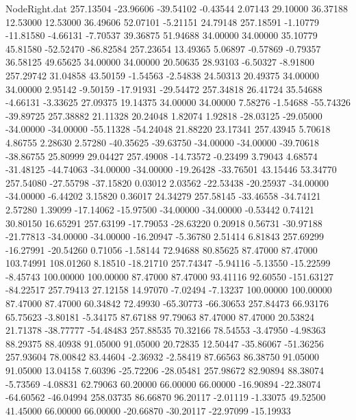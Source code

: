 \begin{filecontents}{NodeRight.dat}
 257.13504  -23.96606  -39.54102    -0.43544    2.07143   29.10000   36.37188   12.53000   12.53000   36.49606   52.07101   -5.21151   24.79148
 257.18591   -1.10779  -11.81580    -4.66131   -7.70537   39.36875   51.94688   34.00000   34.00000   35.10779   45.81580  -52.52470  -86.82584
 257.23654   13.49365    5.06897    -0.57869   -0.79357   36.58125   49.65625   34.00000   34.00000   20.50635   28.93103   -6.50327   -8.91800
 257.29742   31.04858   43.50159    -1.54563   -2.54838   24.50313   20.49375   34.00000   34.00000    2.95142   -9.50159  -17.91931  -29.54472
 257.34818   26.41724   35.54688    -4.66131   -3.33625   27.09375   19.14375   34.00000   34.00000    7.58276   -1.54688  -55.74326  -39.89725
 257.38882   21.11328   20.24048     1.82074    1.92818  -28.03125  -29.05000  -34.00000  -34.00000  -55.11328  -54.24048   21.88220   23.17341
 257.43945    5.70618    4.86755     2.28630    2.57280  -40.35625  -39.63750  -34.00000  -34.00000  -39.70618  -38.86755   25.80999   29.04427
 257.49008  -14.73572   -0.23499     3.79043    4.68574  -31.48125  -44.74063  -34.00000  -34.00000  -19.26428  -33.76501   43.15446   53.34770
 257.54080  -27.55798  -37.15820     0.03012    2.03562  -22.53438  -20.25937  -34.00000  -34.00000   -6.44202    3.15820    0.36017   24.34279
 257.58145  -33.46558  -34.74121     2.57280    1.39099  -17.14062  -15.97500  -34.00000  -34.00000   -0.53442    0.74121   30.80150   16.65291
 257.63199  -17.79053  -28.63220     0.20918    0.56731  -30.97188  -21.77813  -34.00000  -34.00000  -16.20947   -5.36780    2.51414    6.81843
 257.69299  -16.27991  -20.54260     0.71056   -1.58144   72.94688   80.85625   87.47000   87.47000  103.74991  108.01260    8.18510  -18.21710
 257.74347   -5.94116   -5.13550   -15.22599   -8.45743  100.00000  100.00000   87.47000   87.47000   93.41116   92.60550 -151.63127  -84.22517
 257.79413   27.12158   14.97070    -7.02494   -7.13237  100.00000  100.00000   87.47000   87.47000   60.34842   72.49930  -65.30773  -66.30653
 257.84473   66.93176   65.75623    -3.80181   -5.34175   87.67188   97.79063   87.47000   87.47000   20.53824   21.71378  -38.77777  -54.48483
 257.88535   70.32166   78.54553    -3.47950   -4.98363   88.29375   88.40938   91.05000   91.05000   20.72835   12.50447  -35.86067  -51.36256
 257.93604   78.00842   83.44604    -2.36932   -2.58419   87.66563   86.38750   91.05000   91.05000   13.04158    7.60396  -25.72206  -28.05481
 257.98672   82.90894   88.38074    -5.73569   -4.08831   62.79063   60.20000   66.00000   66.00000  -16.90894  -22.38074  -64.60562  -46.04994
 258.03735   86.66870   96.20117    -2.01119   -1.33075   49.52500   41.45000   66.00000   66.00000  -20.66870  -30.20117  -22.97099  -15.19933

\end{filecontents}
